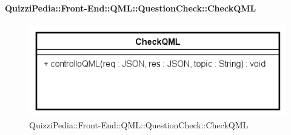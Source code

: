 \paragraph[QuizziPedia::Front-End::QML:: \\ QuestionCheck::CheckQML]{QuizziPedia::Front-End::QML::QuestionCheck::CheckQML}
\begin{figure} [ht]
	\centering
	\includegraphics[scale=0.80]{UML/Classi/Front-End/QuizziPedia_Front-end_QML_QuestionCheck_CheckQML.png}
	\caption{QuizziPedia::Front-End::QML::QuestionCheck::CheckQML}
\end{figure} \FloatBarrier
